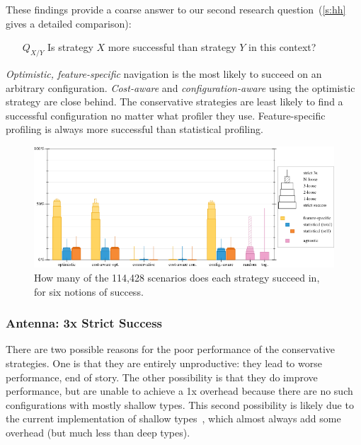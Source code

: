 These findings provide a coarse answer to our second research question~(\cref{s:hh} gives a detailed comparison):

\begin{itemize}
\item[$Q_{X/Y}$] Is strategy $X$ more successful than strategy $Y$ in this
  context?
\end{itemize}

\emph{Optimistic, feature-specific} navigation is the most likely to
succeed on an arbitrary configuration.
\emph{Cost-aware} and \emph{configuration-aware} using the optimistic strategy
are close behind.
The conservative strategies are least likely to find a successful configuration
no matter what profiler they use.
Feature-specific profiling is always more successful than statistical profiling.

\begin{figure}[t]
  \includegraphics[width=\columnwidth]{data/strategy-overall-feasible.pdf}
  \caption{How many of the 114,428 scenarios does each strategy succeed in, for six notions of success.}
  \label{f:strategy-overall}
\end{figure}

\subsubsection{Antenna: 3x Strict Success}
\label{s:antenna}

There are two possible reasons for the poor performance of the conservative
strategies.
One is that they are entirely unproductive: they lead to worse performance, end
of story.
The other possibility is that they do improve performance, but are unable
to achieve a 1x overhead because there are no such configurations with
mostly shallow types.
This second possibility is likely due to the current implementation of shallow
types~\cite{g-deep-shallow}, which almost always add some overhead (but much
less than deep types).

